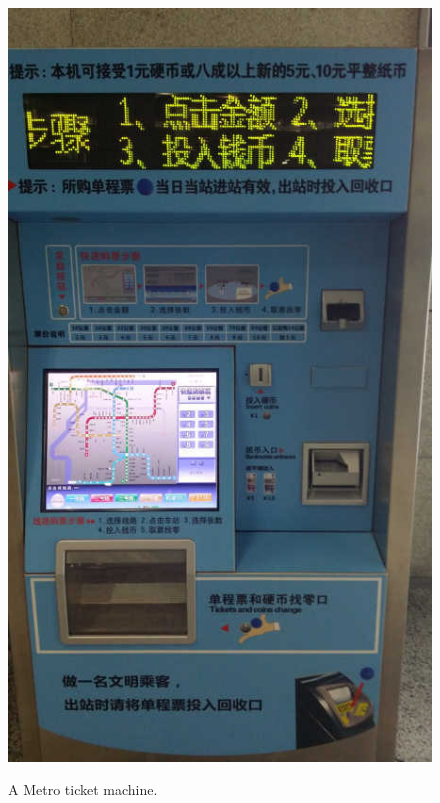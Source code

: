 \documentclass[11pt]{article}
\begin{document}
\begin{figure}[!h]
	\begin{minipage}[t]{.5\textwidth}
     	\centering
        	\includegraphics[scale=0.27]{20150331_110412.jpg} \\
		\caption{A Metro ticket machine.\label{20150331_110412}}
	\end{minipage}%
     \begin{minipage}[t]{.5\textwidth}
         \centering

\end{minipage}
\end{figure}
\end{document}
